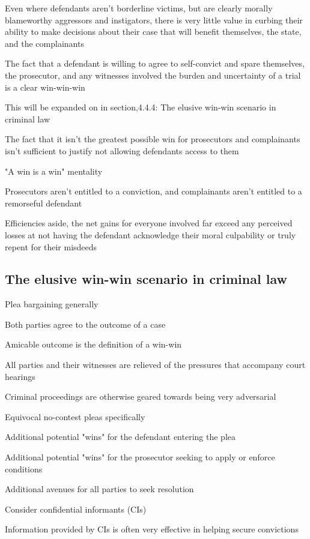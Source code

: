Even where defendants aren't borderline victims, but are clearly morally blameworthy aggressors and instigators, there is very little value in curbing their ability to make decisions about their case that will benefit themselves, the state, and the complainants

The fact that a defendant is willing to agree to self-convict and spare themselves, the prosecutor, and any witnesses involved the burden and uncertainty of a trial is a clear win-win-win

This will be expanded on in section,4.4.4: The elusive win-win scenario in criminal law

The fact that it isn't the greatest possible win for prosecutors and complainants isn't sufficient to justify not allowing defendants access to them

"A win is a win" mentality

Prosecutors aren't entitled to a conviction, and complainants aren't entitled to a remorseful defendant

Efficiencies aside, the net gains for everyone involved far exceed any perceived losses at not having the defendant acknowledge their moral culpability or truly repent for their misdeeds

\subsection{The elusive win-win scenario in criminal law}

Plea bargaining generally

Both parties agree to the outcome of a case

Amicable outcome is the definition of a win-win

All parties and their witnesses are relieved of the pressures that accompany court hearings

Criminal proceedings are otherwise geared towards being very adversarial

Equivocal no-contest pleas specifically

Additional potential "wins" for the defendant entering the plea

Additional potential "wins" for the prosecutor seeking to apply or enforce conditions

Additional avenues for all parties to seek resolution

Consider confidential informants (CIs)

Information provided by CIs is often very effective in helping secure convictions

